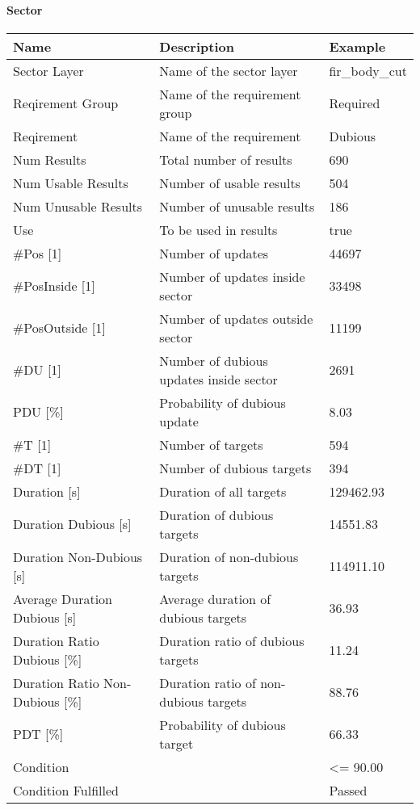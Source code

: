 \paragraph{Sector}

\begin{center}
 \begin{table}[H]
  \begin{tabularx}{\textwidth}{ | l | X |  l | }
    \hline
    \textbf{Name} & \textbf{Description} & \textbf{Example} \\ \hline
    Sector Layer & Name of the sector layer & fir\_body\_cut \\ \hline
    Reqirement Group & Name of the requirement group & Required \\ \hline
    Reqirement & Name of the requirement & Dubious \\ \hline
    Num Results & Total number of results & 690 \\ \hline
    Num Usable Results & Number of usable results & 504 \\ \hline
    Num Unusable Results & Number of unusable results & 186 \\ \hline
    Use & To be used in results & true \\ \hline
    \#Pos [1] & Number of updates & 44697 \\ \hline
    \#PosInside [1] & Number of updates inside sector & 33498 \\ \hline
    \#PosOutside [1] & Number of updates outside sector & 11199 \\ \hline
    \#DU [1] & Number of dubious updates inside sector & 2691 \\ \hline
    PDU [\%] & Probability of dubious update & 8.03 \\ \hline
    \#T [1] & Number of targets & 594 \\ \hline
    \#DT [1] & Number of dubious targets & 394 \\ \hline
    Duration [s] & Duration of all targets & 129462.93 \\ \hline
    Duration Dubious [s] & Duration of dubious targets & 14551.83 \\ \hline
    Duration Non-Dubious [s] & Duration of non-dubious targets & 114911.10 \\ \hline
    Average Duration Dubious [s] & Average duration of dubious targets & 36.93 \\ \hline
    Duration Ratio Dubious [\%] & Duration ratio of dubious targets & 11.24 \\ \hline
    Duration Ratio Non-Dubious [\%] & Duration ratio of non-dubious targets & 88.76 \\ \hline
    PDT [\%] & Probability of dubious target & 66.33 \\ \hline
    Condition &  & <= 90.00 \\ \hline
    Condition Fulfilled &  & Passed \\ \hline
\end{tabularx}
\end{table}
\end{center}

